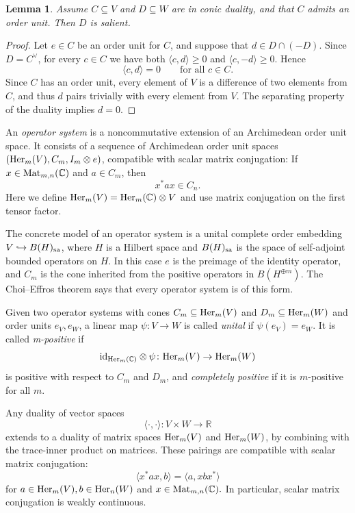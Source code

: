 \documentclass[11pt,onecolumn]{article}
\theoremstyle{plain}
\newtheorem{lemma}[lemma]{Lemma}
\theoremstyle{definition}
\begin{document}
\begin{lemma}
\label{lem:dualsalient}
    Assume $C\subseteq V$ and $D\subseteq W$ are in conic duality, and that $C$ admits an order unit. Then $D$ is salient.
\end{lemma}
\begin{proof}
    Let $e\in C$ be an order unit for $C$, and suppose that
    $d\in D\cap(-D)$.  Since $D=C^\vee$, for every $c\in C$ we have both
    $\langle c,d\rangle\geqslant 0$ and
    $\langle c,-d\rangle\geqslant 0$.  Hence
    \[
        \langle c,d\rangle=0
        \qquad\text{for all }c\in C.
    \]
    Since $C$ has an order unit, every element of $V$ is a difference of two elements from $C$, and thus $d$ pairs trivially with every element from $V$.
    The separating property of
    the duality implies $d=0$. 
\end{proof}


An \emph{operator system} is a noncommutative extension of an Archimedean order unit space.  It consists of a sequence of Archimedean order unit spaces $({\rm Her}_m(V),C_m,I_m\otimes e)$, compatible with  scalar matrix conjugation: If $x\in {\rm Mat}_{m,n}(\mathbb{C})$
and $a\in C_m$, then
\[
    x^*ax\in C_n.
\]
Here we define ${\rm Her}_m(V)={\rm Her}_m(\mathbb C)\otimes V$ and use matrix conjugation on the first tensor factor.

The concrete model of an operator system is a unital complete order embedding
$V\hookrightarrow B(H)_{\rm sa}$, where $H$ is a Hilbert space and $B(H)_{\rm sa}$ is the  space of self-adjoint bounded operators on $H$.  In this case $e$ is the preimage of the identity operator, and
$C_m$ is the cone inherited from the positive operators in
$B(H^{\oplus m})$.  The Choi--Effros theorem says that every
operator system is of this form.

Given two  operator systems with cones
$C_m\subseteq {\rm Her}_m(V)$ and $D_m\subseteq {\rm Her}_m(W)$ and order units $e_V,e_W$, a linear map $\psi\colon V\to W$ is called \emph{unital} if $\psi(e_V)=e_W$. It is called 
\emph{m-positive} if
\[
  {\rm id}_{{\rm Her}_m(\mathbb C)}\otimes \psi\colon {\rm Her}_m(V)\to{\rm Her}_m(W)  
\]
is positive with respect to $C_m$ and $D_m$, and \emph{completely positive} if it is \(m\)-positive for all \(m\).

Any duality of vector spaces \[
    \langle\cdot,\cdot\rangle\colon V\times W\to\mathbb R
\]
extends to a duality of matrix spaces ${\rm Her}_m(V)$ and ${\rm Her}_m(W)$, by combining with the trace-inner product on matrices. These pairings are compatible with scalar matrix conjugation:
\[
    \langle x^*ax,b\rangle=\langle a,xbx^*\rangle
\]
for $a\in{\rm Her}_m(V), b\in{\rm Her}_n(W)$ and $x\in{\rm Mat}_{m,n}(\mathbb C).$ In particular, scalar matrix conjugation is weakly continuous.
\end{document}
